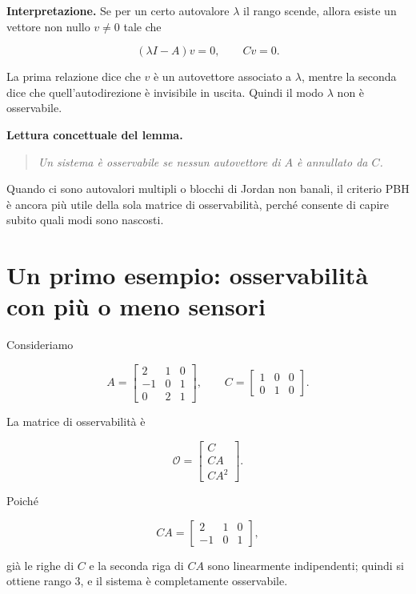 \medskip

\noindent\textbf{Interpretazione.}
Se per un certo autovalore \(\lambda\) il rango scende, allora esiste un vettore non nullo \(v\neq 0\) tale che

\[
(\lambda I-A)v=0,
\qquad
Cv=0.
\]

La prima relazione dice che \(v\) è un autovettore associato a \(\lambda\), mentre la seconda dice che quell'autodirezione è invisibile in uscita.  
Quindi il modo \(\lambda\) non è osservabile.

\medskip

\noindent\textbf{Lettura concettuale del lemma.}
\begin{quote}
\emph{Un sistema è osservabile se nessun autovettore di \(A\) è annullato da \(C\).}
\end{quote}

Quando ci sono autovalori multipli o blocchi di Jordan non banali, il criterio PBH è ancora più utile della sola matrice di osservabilità, perché consente di capire subito quali modi sono nascosti.

\section{Un primo esempio: osservabilità con più o meno sensori}

Consideriamo

\[
A=
\begin{bmatrix}
2 & 1 & 0\\
-1 & 0 & 1\\
0 & 2 & 1
\end{bmatrix},
\qquad
C=
\begin{bmatrix}
1 & 0 & 0\\
0 & 1 & 0
\end{bmatrix}.
\]

La matrice di osservabilità è

\[
\mathcal O=
\begin{bmatrix}
C\\
CA\\
CA^2
\end{bmatrix}.
\]

Poiché

\[
CA=
\begin{bmatrix}
2 & 1 & 0\\
-1 & 0 & 1
\end{bmatrix},
\]

già le righe di \(C\) e la seconda riga di \(CA\) sono linearmente indipendenti; quindi si ottiene rango \(3\), e il sistema è completamente osservabile.

